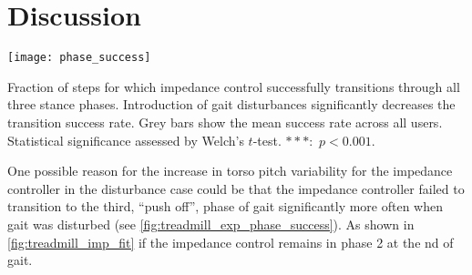 \section{Discussion}

\begin{marginfigure}
    \centering 
    \texttt{[image: phase\_success]}
    \caption{Fraction of steps for which impedance control successfully
    transitions through all three stance phases. Introduction of gait
    disturbances significantly decreases the transition success rate. Grey bars
    show the mean success rate across all users. Statistical significance
    assessed by Welch's $t$-test. $***$:~$p <
    0.001$.}\label{fig:treadmill_exp_phase_success}
\end{marginfigure}
One possible reason for the increase in torso pitch variability for the
impedance controller in the disturbance case could be that the impedance
controller failed to transition to the third, ``push off'', phase of gait
significantly more often when gait was disturbed (see
\cref{fig:treadmill_exp_phase_success}). As shown in
\cref{fig:treadmill_imp_fit} if the impedance control remains in phase 2 at the
nd of gait.
